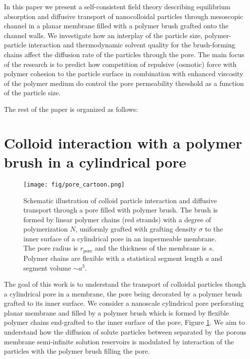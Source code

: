 \documentclass[12pt, a4paper]{article}
\begin{document}
In this paper we present a self-consistent field theory describing equilibrium absorption and diffusive transport of nanocolloidal particles
through mesoscopic channel in a planar membrane filled with a polymer brush grafted onto the channel walls. We investigate how an interplay of the particle size,
polymer-particle interaction and thermodynamic solvent quality for the brush-forming chains affect the diffusion rate of the particles through the pore. 
The main focus of the research is to predict how competition of repulsive (osmotic) force with polymer cohesion to the particle surface in combination with
enhanced viscosity of the polymer medium do control the  pore permeability threshold as a function of the particle size.


The rest of the paper is organized as follows: 



\section{Colloid interaction with a polymer brush in a cylindrical pore}


\begin{figure}
    \centering
    \texttt{[image: fig/pore\_cartoon.png]}
    \caption{
        Schematic illustration of colloid particle interaction and diffusive transport through a pore filled with polymer brush. 
        The brush is formed by linear polymer chains (red strands) with a degree of polymerization $N$, uniformly grafted with grafting density $\sigma$  
        to the inner surface of a cylindrical pore in an impermeable membrane. The pore radius is $r_{\textrm{pore}}$ and the thickness of the membrane is $s$.
        Polymer chains are flexible with a statistical segment length $a$ and segment volume $\sim a^3$.
}
    \label{fig:colloid_transport}
\end{figure}

The goal of this work is to understand the transport of colloidal particles though a cylindrical pore in a membrane, the pore being decorated by a polymer brush grafted to its inner surface. 
We consider a nanoscale cylindrical pore perforating planar membrane and filled by a polymer brush which is formed  
by flexible polymer chains end-grafted to the inner surface of the pore, Figure \ref{fig:colloid_transport}. 
We aim to understand how the diffusion of solute particles between separated by the porous
membrane semi-infinite solution reservoirs is modulated by interaction of the particles with the 
polymer brush filling the pore.
\end{document}

